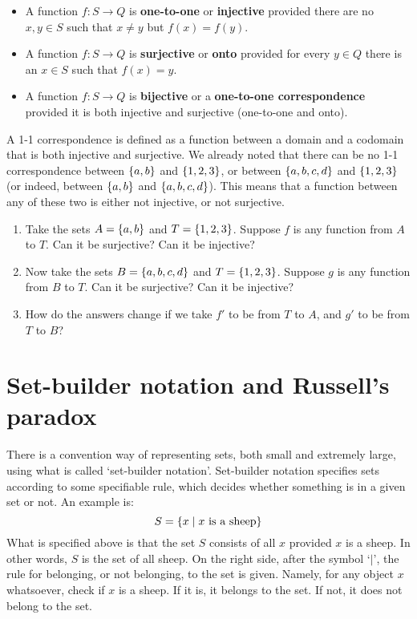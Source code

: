 \begin{defn} \leavevmode
\begin{itemize} 
\item A function $f: S \to Q$ is \textbf{one-to-one} or \textbf{injective} provided there are no $x, y \in S$ such that $x \neq y$ but $f(x)=f(y)$. 
\item A function $f: S \to Q$ is \textbf{surjective} or \textbf{onto} provided for every $y \in Q$ there is an $x \in S$ such that $f(x)=y$. 
\item A function $f: S \to Q$ is \textbf{bijective} or a \textbf{one-to-one correspondence} provided it is both injective and surjective (one-to-one and onto). 
\end{itemize}
\end{defn}

\begin{exc}
	A 1-1 correspondence is defined as a function between a domain and a codomain that is both injective and surjective. We already noted that there can be no 1-1 correspondence between $\{a,b\}$ and $\{1,2,3\}$, or between $\{a, b, c, d\}$ and $\{1, 2, 3\}$ (or indeed, between $\{a, b\}$ and $\{a,b,c,d\}$). This means that a function between any of these two is either not injective, or not surjective. 
	
	\begin{enumerate}
	\item Take the sets $A=\{a, b\}$ and $T=\{1, 2, 3\}$. Suppose $f$ is any function from $A$ to $T$. Can it be surjective? Can it be injective?
	\item Now take the sets $B=\{a, b, c, d\}$ and $T=\{1, 2, 3\}$. Suppose $g$ is any function from $B$ to $T$. Can it be surjective? Can it be injective?
	\item How do the answers change if we take $f'$ to be from $T$ to $A$, and $g'$ to be from $T$ to $B$?
	\end{enumerate}
\end{exc}

\section{Set-builder notation and Russell's paradox}

There is a convention way of representing sets, both small and extremely large, using what is called `set-builder notation'. Set-builder notation specifies sets according to some specifiable rule, which decides whether something is in a given set or not. An example is:
\[
S=\{x \mid x\text{ is a sheep}\}
\]
What is specified above is that the set $S$ consists of all $x$ provided $x$ is a sheep. In other words, $S$ is the set of all sheep. On the right side, after the symbol `$\mid$', the rule for belonging, or not belonging, to the set is given. Namely, for any object $x$ whatsoever, check if $x$ is a sheep. If it is, it belongs to the set. If not, it does not belong to the set. 

